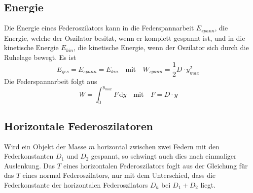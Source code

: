 \documentclass{article}
\begin{document}
\subsection{Energie}
Die Energie eines Federoszilators kann in die Federspannarbeit $E_{spann}$, die Energie, welche der Oszilator besitzt, wenn er komplett gespannt ist, und in die kinetische Energie $E_{kin}$, die kinetische Energie, wenn der Oszilator sich durch die Ruhelage bewegt. Es ist
\[
 E_{ges} = E_{spann} = E_{kin}
 \quad \text{mit} \quad 
 W_{spann} = \frac{1}{2} D \cdot y_{max}^2
\]
Die Federspannarbeit folgt aus
\[
 W = \int_0^{y_{max}} F \,\text{d}y
 \quad \text{mit} \quad
 F = D \cdot y 
\]
 
\subsection{Horizontale Federoszilatoren}
Wird ein Objekt der Masse $m$ horizontal zwischen zwei Federn mit den Federkonstanten $D_1$ und $D_2$ gespannt, so schwingt auch dies nach einmaliger Auslenkung. Das $T$ eines horizontalen Federoszilators foglt aus der Gleichung für das $T$ eines normal Federoszilators, nur mit dem Unterschied, dass die Federkonstante der horizontalen Federoszilators $D_h$ bei $D_1 + D_2$ liegt. 
 
\end{document}
